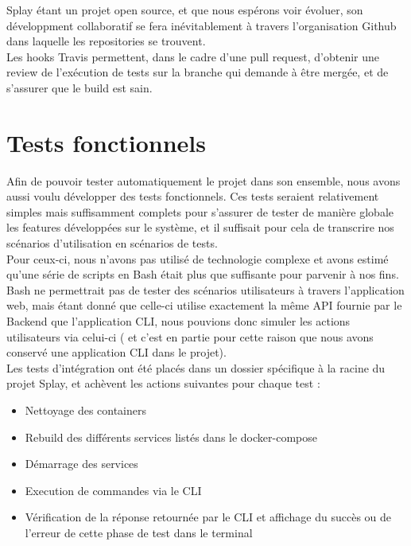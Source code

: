 \documentclass{eplmastersthesis}
\begin{document}
        Splay étant un projet open source, et que nous espérons voir évoluer, son
        développment collaboratif se fera inévitablement à travers l'organisation
        Github dans laquelle les repositories se trouvent.\\
        Les hooks Travis permettent, dans le cadre d'une pull request, d'obtenir
        une review de l'exécution de tests sur la branche qui demande à être
        mergée, et de s'assurer que le build est sain.

    \section{Tests fonctionnels}

      Afin de pouvoir tester automatiquement le projet dans son ensemble, nous
      avons aussi voulu développer des tests fonctionnels. Ces tests seraient
      relativement simples mais suffisamment complets pour s'assurer de
      tester de manière globale les features développées sur le système, et
      il suffisait pour cela de transcrire nos scénarios d'utilisation en
      scénarios de tests.\\

      Pour ceux-ci, nous n'avons pas utilisé de technologie complexe et avons
      estimé qu'une série de scripts en Bash était plus que suffisante pour
      parvenir à nos fins. Bash ne permettrait pas de tester des scénarios
      utilisateurs à travers l'application web, mais étant donné que celle-ci
      utilise exactement la même API fournie par le Backend que l'application
      CLI, nous pouvions donc simuler les actions utilisateurs via celui-ci (
      et c'est en partie pour cette raison que nous avons conservé une
      application CLI dans le projet).\\

      Les tests d'intégration ont été placés dans un dossier spécifique à la
      racine du projet Splay, et achèvent les actions suivantes pour chaque
      test : \\

      \begin{itemize}
        \item Nettoyage des containers
        \item Rebuild des différents services listés dans le docker-compose
        \item Démarrage des services
        \item Execution de commandes via le CLI
        \item Vérification de la réponse retournée par le CLI et affichage du
        succès ou de l'erreur de cette phase de test dans le terminal
      \end{itemize}
\end{document}

